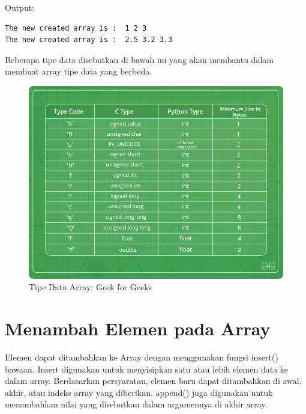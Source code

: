 Output:

\begin{lstlisting}
The new created array is :  1 2 3 
The new created array is :  2.5 3.2 3.3 
\end{lstlisting}

Beberapa tipe data disebutkan di bawah ini yang akan membantu dalam membuat array tipe data yang berbeda.

\begin{figure}[H]
        \centerline{\includegraphics[scale=0.5]{figures/array/array-2}}
        \caption{Tipe Data Array: Geek for Geeks}
\end{figure}

\section{Menambah Elemen pada Array}
Elemen dapat ditambahkan ke Array dengan menggunakan fungsi insert() bawaan. Insert digunakan untuk menyisipkan satu atau lebih elemen data ke dalam array. Berdasarkan persyaratan, elemen baru dapat ditambahkan di awal, akhir, atau indeks array yang diberikan. append() juga digunakan untuk menambahkan nilai yang disebutkan dalam argumennya di akhir array.

